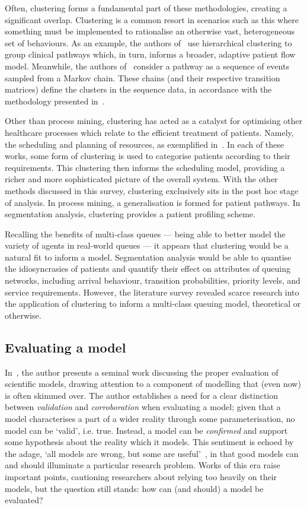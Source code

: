 Often, clustering forms a fundamental part of these methodologies, creating a
significant overlap. Clustering is a common resort in scenarios such as
this where something must be implemented to rationalise an otherwise vast,
heterogeneous set of behaviours. As an example, the authors
of~\cite{Prokofyeva2020} use hierarchical clustering to group clinical pathways
which, in turn, informs a broader, adaptive patient flow model. Meanwhile, the
authors of~\cite{Rebuge2012} consider a pathway as a sequence of events sampled
from a Markov chain. These chains (and their respective transition matrices)
define the clusters in the sequence data, in accordance with the methodology
presented in~\cite{Cadez2000}.

Other than process mining, clustering has acted as a catalyst for optimising
other healthcare processes which relate to the efficient treatment of patients.
Namely, the scheduling and planning of resources, as exemplified
in~\cite{Nasir2018,Steins2013,Yousefi2020}. In each of these works, some form of
clustering is used to categorise patients according to their requirements. This
clustering then informs the scheduling model, providing a richer and more
sophisticated picture of the overall system. With the other methods discussed in
this survey, clustering exclusively sits in the post hoc stage of analysis. In
process mining, a generalisation is formed for patient pathways. In segmentation
analysis, clustering provides a patient profiling scheme.

Recalling the benefits of multi-class queues --- being able to better model the
variety of agents in real-world queues --- it appears that clustering would be a
natural fit to inform a model. Segmentation analysis would be able to quantise
the idiosyncrasies of patients and quantify their effect on attributes of
queuing networks, including arrival behaviour, transition probabilities,
priority levels, and service requirements. However, the literature survey
revealed scarce research into the application of clustering to inform a
multi-class queuing model, theoretical or otherwise.


\subsection{Evaluating a model}

In~\cite{Caswell1976}, the author presents a seminal work discussing the proper
evaluation of scientific models, drawing attention to a component of modelling
that (even now) is often skimmed over. The author establishes a need for a clear
distinction between \emph{validation} and \emph{corroboration} when evaluating a
model; given that a model characterises a part of a wider reality through some
parameterisation, no model can be `valid', i.e. true. Instead, a model can be
\emph{confirmed} and support some hypothesis about the reality which it models.
This sentiment is echoed by the adage, `all models are wrong, but some are
useful'~\cite{Box1979}, in that good models can and should illuminate a
particular research problem. Works of this era raise important points,
cautioning researchers about relying too heavily on their models, but the
question still stands: how can (and should) a model be evaluated?


